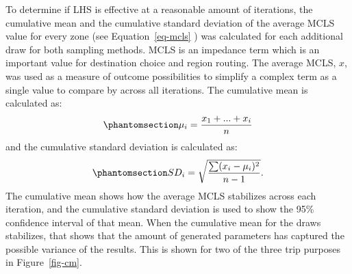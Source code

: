 \documentclass[
  futuretransp,
  submit,
  moreauthors,
]{Definitions/mdpi}
\begin{document}
To determine if LHS is effective at a reasonable amount of iterations,
the cumulative mean and the cumulative standard deviation of the average
MCLS value for every zone (see Equation~\ref{eq-mcls} ) was calculated
for each additional draw for both sampling methods. MCLS is an impedance
term which is an important value for destination choice and region
routing. The average MCLS, \(x\), was used as a measure of outcome
possibilities to simplify a complex term as a single value to compare by
across all iterations. The cumulative mean is calculated as:
\begin{equation}\phantomsection\label{eq-cmclsmean}{
\mu_i = \frac{x_1 + ... + x_i}{n}
}\end{equation} and the cumulative standard deviation is calculated as:
\begin{equation}\phantomsection\label{eq-sdi}{
SD_i = \sqrt{\frac{\sum (x_i - \mu_i)^2 }{n-1}}.
}\end{equation} The cumulative mean shows how the average MCLS
stabilizes across each iteration, and the cumulative standard deviation
is used to show the 95\% confidence interval of that mean. When the
cumulative mean for the draws stabilizes, that shows that the amount of
generated parameters has captured the possible variance of the results.
This is shown for two of the three trip purposes in Figure~\ref{fig-cm}.
\end{document}
